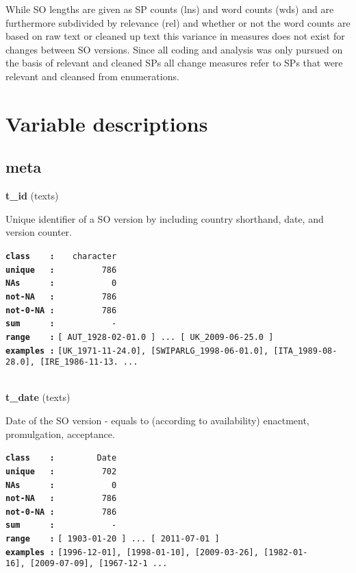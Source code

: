 \documentclass[]{article}
\begin{document}
While SO lengths are given as SP counts (lns) and word counts (wds) and
are furthermore subdivided by relevance (rel) and whether or not the
word counts are based on raw text or cleaned up text this variance in
measures does not exist for changes between SO versions. Since all
coding and analysis was only pursued on the basis of relevant and
cleaned SPs all change measures refer to SPs that were relevant and
cleansed from enumerations.

\section{Variable descriptions}\label{variable-descriptions}

\subsection{meta}\label{meta}

\textbf{t\_id} (texts)

Unique identifier of a SO version by including country shorthand, date,
and version counter.

\textbf{\texttt{class\ \ \ \ :}} \texttt{~~~character}\\
\textbf{\texttt{unique\ \ \ :}} \texttt{~~~~~~~~~786}\\
\textbf{\texttt{NAs\ \ \ \ \ \ :}} \texttt{~~~~~~~~~~~0}\\
\textbf{\texttt{not-NA\ \ \ :}} \texttt{~~~~~~~~~786}\\
\textbf{\texttt{not-0-NA\ :}} \texttt{~~~~~~~~~786}\\
\textbf{\texttt{sum\ \ \ \ \ \ :}} \texttt{~~~~~~~~~~~-}\\
\textbf{\texttt{range\ \ \ \ :}}
\texttt{{[}\ AUT\_1928-02-01.0\ {]}\ ...\ {[}\ UK\_2009-06-25.0\ {]}}\\
\textbf{\texttt{examples\ :}}
\texttt{{[}UK\_1971-11-24.0{]},\ {[}SWIPARLG\_1998-06-01.0{]},\ {[}ITA\_1989-08-28.0{]},\ {[}IRE\_1986-11-13.\ ...}\\

~

\textbf{t\_date} (texts)

Date of the SO version - equals to (according to availability)
enactment, promulgation, acceptance.

\textbf{\texttt{class\ \ \ \ :}} \texttt{~~~~~~~~Date}\\
\textbf{\texttt{unique\ \ \ :}} \texttt{~~~~~~~~~702}\\
\textbf{\texttt{NAs\ \ \ \ \ \ :}} \texttt{~~~~~~~~~~~0}\\
\textbf{\texttt{not-NA\ \ \ :}} \texttt{~~~~~~~~~786}\\
\textbf{\texttt{not-0-NA\ :}} \texttt{~~~~~~~~~786}\\
\textbf{\texttt{sum\ \ \ \ \ \ :}} \texttt{~~~~~~~~~~~-}\\
\textbf{\texttt{range\ \ \ \ :}}
\texttt{{[}\ 1903-01-20\ {]}\ ...\ {[}\ 2011-07-01\ {]}}\\
\textbf{\texttt{examples\ :}}
\texttt{{[}1996-12-01{]},\ {[}1998-01-10{]},\ {[}2009-03-26{]},\ {[}1982-01-16{]},\ {[}2009-07-09{]},\ {[}1967-12-1\ ...}\\
\end{document}
